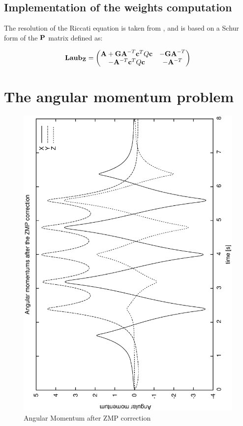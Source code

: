 \subsection{Implementation of the weights computation}
     The resolution of the Riccati equation is taken from \cite{Laub1979}, and is
     based on a Schur form of the ${\bf P}$ matrix defined as:

     \begin{equation}
     {\bf Laub_Z} =
     \left(
     \begin{matrix}
     {\bf A} + {\bf GA}^{-T}{\bf c}^TQ{\bf c} & -{\bf GA}^{-T} \\
     -{\bf A}^{-T}{\bf c}^TQ{\bf c} & -{\bf A}^{-T} \\
     \end{matrix}
     \right)
     \end{equation}

\section{The angular momentum problem}
\begin{figure}[htb]
\begin{center}
\includegraphics[width=\linewidth]{./figures/PatternGenerator/AngularMomentum}
\caption{Angular Momentum after ZMP correction}
\label{pic:AngularMomentum}
\end{center}
\end{figure}

